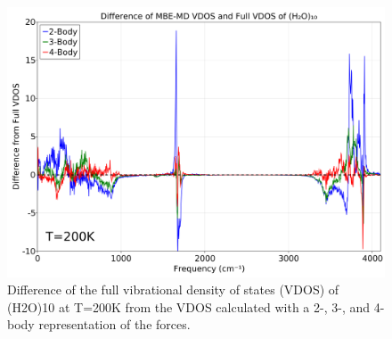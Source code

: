 \begin{figure}[h]
\uwsinglespace
\begin{center}
\begin{minipage}{0.9\textwidth}
\includegraphics[width=\textwidth]{Figures/Chapter_4/ch4_figure_5.png}
\end{minipage}
\end{center}
\caption[Difference of the full vibrational density of states (VDOS) of (H2O)10 at T=200K from the VDOS calculated with a 2-, 3-, and 4-body representation of the forces.]{Difference of the full vibrational density of states (VDOS) of (H2O)10 at T=200K from the VDOS calculated with a 2-, 3-, and 4-body representation of the forces.}
\label{fig:MBE_MD_F5}
\end{figure}
